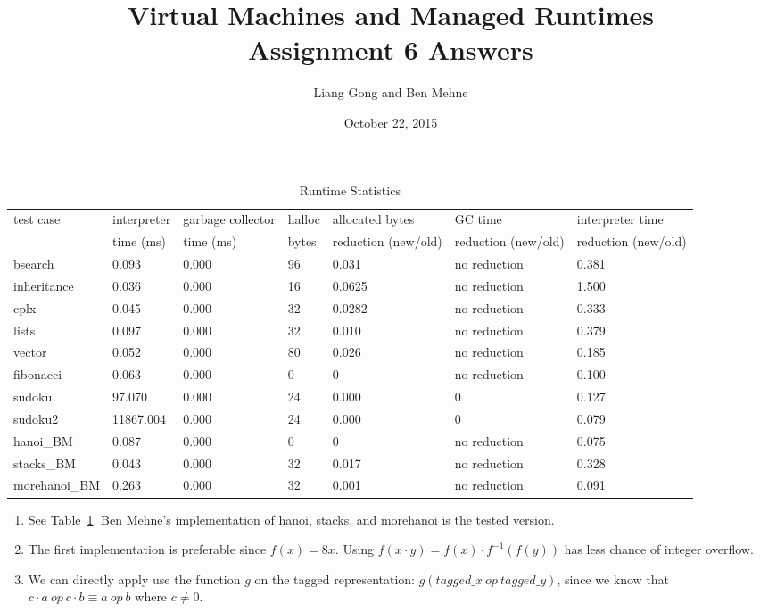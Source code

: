 \documentclass[notitlepage]{report}
\title{\vspace{-0.5in}Virtual Machines and Managed Runtimes \\ Assignment 6 Answers}
\date{\vspace{-0.5in}October 22, 2015}
\author{\vspace{-0.5in}Liang Gong and Ben Mehne\vspace{-0.5in}}
\newcommand{\code}[1]{{\ttfamily #1}}
\begin{document}
\maketitle

\begin{table}[!htp]
\centering
\caption{Runtime Statistics}
\label{statistics}
{\footnotesize
\begin{tabular}{lllllll}
\toprule
test case & interpreter & garbage collector & \code{halloc} & allocated bytes     & GC time             & interpreter time    \\
          & time (ms)   & time (ms)         & bytes         & reduction (new/old) & reduction (new/old) & reduction (new/old) \\
\midrule
bsearch        & 0.093          & 0.000          & 96             & 0.031		& no reduction		& 0.381 \\
inheritance    & 0.036          & 0.000          & 16             & 0.0625		& no reduction		& 1.500 \\
cplx           & 0.045          & 0.000          & 32             & 0.0282		& no reduction		& 0.333 \\
lists          & 0.097          & 0.000          & 32             & 0.010		& no reduction		& 0.379 \\
vector         & 0.052          & 0.000          & 80             & 0.026		& no reduction		& 0.185 \\
fibonacci      & 0.063          & 0.000          & 0              & 0		& no reduction		& 0.100 \\
sudoku         & 97.070         & 0.000          & 24             & 0.000		& 0		& 0.127 \\
sudoku2        & 11867.004      & 0.000          & 24             & 0.000		& 0		& 0.079 \\
hanoi\_BM      & 0.087          & 0.000          & 0              & 0		& no reduction		& 0.075 \\
stacks\_BM     & 0.043          & 0.000          & 32             & 0.017		& no reduction	& 0.328	\\
morehanoi\_BM  & 0.263          & 0.000          & 32             & 0.001		& no reduction		& 0.091 \\

\bottomrule
\end{tabular}
}
\end{table}

\begin{enumerate}
	\item
		See Table~\ref{statistics}. Ben Mehne's implementation of hanoi, stacks, and morehanoi is the tested version.
	\item
		The first implementation is preferable since $f(x) = 8x$. Using $f(x \cdot y) = f(x) \cdot f^{-1}(f(y))$ has less chance
		of integer overflow.
	\item
		We can directly apply use the function $g$ on the tagged representation: $g (tagged\_x\ op\ tagged\_y)$, since we know that $c \cdot a\ op\ c \cdot b \equiv a\ op\ b$ where $c \neq 0$.
\end{enumerate}
\end{document}
